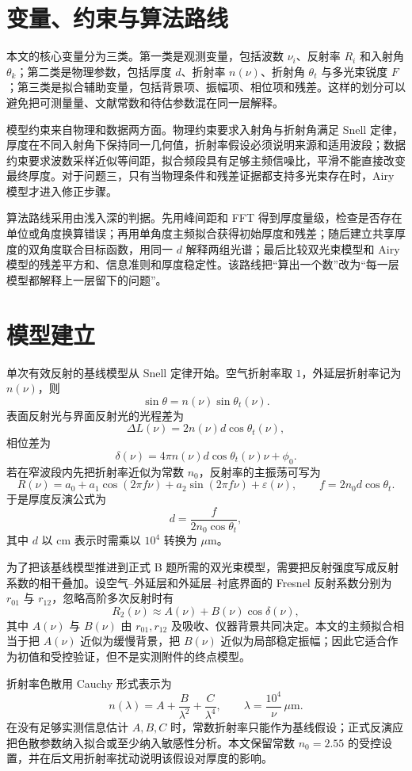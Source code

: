 \documentclass[UTF8]{ctexart}
\begin{document}
\section{变量、约束与算法路线}
本文的核心变量分为三类。第一类是观测变量，包括波数 $\nu_i$、反射率 $R_i$ 和入射角 $\theta_k$；第二类是物理参数，包括厚度 $d$、折射率 $n(\nu)$、折射角 $\theta_t$ 与多光束锐度 $F$；第三类是拟合辅助变量，包括背景项、振幅项、相位项和残差。这样的划分可以避免把可测量量、文献常数和待估参数混在同一层解释。

模型约束来自物理和数据两方面。物理约束要求入射角与折射角满足 Snell 定律，厚度在不同入射角下保持同一几何值，折射率假设必须说明来源和适用波段；数据约束要求波数采样近似等间距，拟合频段具有足够主频信噪比，平滑不能直接改变最终厚度。对于问题三，只有当物理条件和残差证据都支持多光束存在时，Airy 模型才进入修正步骤。

算法路线采用由浅入深的判据。先用峰间距和 FFT 得到厚度量级，检查是否存在单位或角度换算错误；再用单角度主频拟合获得初始厚度和残差；随后建立共享厚度的双角度联合目标函数，用同一 $d$ 解释两组光谱；最后比较双光束模型和 Airy 模型的残差平方和、信息准则和厚度稳定性。该路线把“算出一个数”改为“每一层模型都解释上一层留下的问题”。

\section{模型建立}
单次有效反射的基线模型从 Snell 定律开始。空气折射率取 $1$，外延层折射率记为 $n(\nu)$，则
\[
\sin\theta=n(\nu)\sin\theta_t(\nu).
\]
表面反射光与界面反射光的光程差为
\[
\Delta L(\nu)=2n(\nu)d\cos\theta_t(\nu),
\]
相位差为
\[
\delta(\nu)=4\pi n(\nu)d\cos\theta_t(\nu)\nu+\phi_0.
\]
若在窄波段内先把折射率近似为常数 $n_0$，反射率的主振荡可写为
\[
R(\nu)=a_0+a_1\cos(2\pi f\nu)+a_2\sin(2\pi f\nu)+\varepsilon(\nu),
\qquad f=2n_0d\cos\theta_t.
\]
于是厚度反演公式为
\[
d=\frac{f}{2n_0\cos\theta_t},
\]
其中 $d$ 以 $\mathrm{cm}$ 表示时需乘以 $10^4$ 转换为 $\mu\mathrm{m}$。

为了把该基线模型推进到正式 B 题所需的双光束模型，需要把反射强度写成反射系数的相干叠加。设空气--外延层和外延层--衬底界面的 Fresnel 反射系数分别为 $r_{01}$ 与 $r_{12}$，忽略高阶多次反射时有
\[
R_2(\nu)\approx A(\nu)+B(\nu)\cos\delta(\nu),
\]
其中 $A(\nu)$ 与 $B(\nu)$ 由 $r_{01},r_{12}$ 及吸收、仪器背景共同决定。本文的主频拟合相当于把 $A(\nu)$ 近似为缓慢背景，把 $B(\nu)$ 近似为局部稳定振幅；因此它适合作为初值和受控验证，但不是实测附件的终点模型。

折射率色散用 Cauchy 形式表示为
\[
n(\lambda)=A+\frac{B}{\lambda^2}+\frac{C}{\lambda^4},
\qquad \lambda=\frac{10^4}{\nu}\,\mu\mathrm{m}.
\]
在没有足够实测信息估计 $A,B,C$ 时，常数折射率只能作为基线假设；正式反演应把色散参数纳入拟合或至少纳入敏感性分析。本文保留常数 $n_0=2.55$ 的受控设置，并在后文用折射率扰动说明该假设对厚度的影响。
\end{document}
